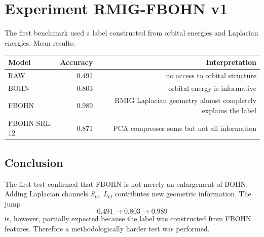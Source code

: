 \section{Experiment RMIG-FBOHN v1}
\label{sec:rmig_fbohn_v1}

The first benchmark used a label constructed from orbital energies and Laplacian energies. Mean results:
\begin{center}
\begin{tabular}{lrr}
\toprule
Model & Accuracy & Interpretation\\
\midrule
RAW & 0.491 & no access to orbital structure\\
BOHN & 0.803 & orbital energy is informative\\
FBOHN & 0.989 & RMIG Laplacian geometry almost completely explains the label\\
FBOHN-SRL-12 & 0.871 & PCA compresses some but not all information\\
\bottomrule
\end{tabular}
\end{center}

\subsection{Conclusion}

The first test confirmed that FBOHN is not merely an enlargement of BOHN. Adding Laplacian channels $S_O$, $L_O$ contributes new geometric information. The jump
\[
0.491\to 0.803\to 0.989
\]
is, however, partially expected because the label was constructed from FBOHN features. Therefore a methodologically harder test was performed.
